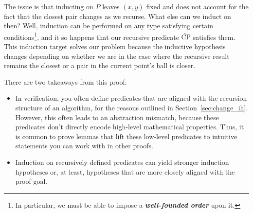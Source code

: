 \documentclass{article}
\begin{document}
The issue is that inducting on $P$ leaves $(x, y)$ fixed and does not account for the fact that the closest pair changes as we recurse.
What else can we induct on then?
Well, induction can be performed on any type satisfying certain conditions\footnote{In particular, we must be able to impose a \textbf{\textit{well-founded order}} upon it.}, and it so happens that our recursive predicate $\widetilde{\text{CP}}$ satisfies them.
This induction target solves our problem because the inductive hypothesis changes depending on whether we are in the case where the recursive result remains the closest or a pair in the current point's ball is closer.

There are two takeaways from this proof:
\begin{itemize}
  \item In verification, you often define predicates that are aligned with the recursion structure of an algorithm, for the reasons outlined in Section~\ref{sec:change_ih}.
  However, this often leads to an abstraction mismatch, because these predicates don't directly encode high-level mathematical properties.
  Thus, it is common to prove lemmas that lift these low-level predicates to intuitive statements you can work with in other proofs.
  \item Induction on recursively defined predicates can yield stronger induction hypotheses or, at least, hypotheses that are more closely aligned with the proof goal.
\end{itemize}

\end{document}
